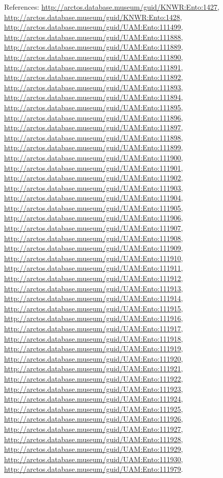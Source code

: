 \documentclass[9pt, article]{memoir}
\begin{document}
\begin{multicols}{2}
References: 
\url{http://arctos.database.museum/guid/KNWR:Ento:1427}, 
\url{http://arctos.database.museum/guid/KNWR:Ento:1428}, 
\url{http://arctos.database.museum/guid/UAM:Ento:111499}, 
\url{http://arctos.database.museum/guid/UAM:Ento:111888}, 
\url{http://arctos.database.museum/guid/UAM:Ento:111889}, 
\url{http://arctos.database.museum/guid/UAM:Ento:111890}, 
\url{http://arctos.database.museum/guid/UAM:Ento:111891}, 
\url{http://arctos.database.museum/guid/UAM:Ento:111892}, 
\url{http://arctos.database.museum/guid/UAM:Ento:111893}, 
\url{http://arctos.database.museum/guid/UAM:Ento:111894}, 
\url{http://arctos.database.museum/guid/UAM:Ento:111895}, 
\url{http://arctos.database.museum/guid/UAM:Ento:111896}, 
\url{http://arctos.database.museum/guid/UAM:Ento:111897}, 
\url{http://arctos.database.museum/guid/UAM:Ento:111898}, 
\url{http://arctos.database.museum/guid/UAM:Ento:111899}, 
\url{http://arctos.database.museum/guid/UAM:Ento:111900}, 
\url{http://arctos.database.museum/guid/UAM:Ento:111901}, 
\url{http://arctos.database.museum/guid/UAM:Ento:111902}, 
\url{http://arctos.database.museum/guid/UAM:Ento:111903}, 
\url{http://arctos.database.museum/guid/UAM:Ento:111904}, 
\url{http://arctos.database.museum/guid/UAM:Ento:111905}, 
\url{http://arctos.database.museum/guid/UAM:Ento:111906}, 
\url{http://arctos.database.museum/guid/UAM:Ento:111907}, 
\url{http://arctos.database.museum/guid/UAM:Ento:111908}, 
\url{http://arctos.database.museum/guid/UAM:Ento:111909}, 
\url{http://arctos.database.museum/guid/UAM:Ento:111910}, 
\url{http://arctos.database.museum/guid/UAM:Ento:111911}, 
\url{http://arctos.database.museum/guid/UAM:Ento:111912}, 
\url{http://arctos.database.museum/guid/UAM:Ento:111913}, 
\url{http://arctos.database.museum/guid/UAM:Ento:111914}, 
\url{http://arctos.database.museum/guid/UAM:Ento:111915}, 
\url{http://arctos.database.museum/guid/UAM:Ento:111916}, 
\url{http://arctos.database.museum/guid/UAM:Ento:111917}, 
\url{http://arctos.database.museum/guid/UAM:Ento:111918}, 
\url{http://arctos.database.museum/guid/UAM:Ento:111919}, 
\url{http://arctos.database.museum/guid/UAM:Ento:111920}, 
\url{http://arctos.database.museum/guid/UAM:Ento:111921}, 
\url{http://arctos.database.museum/guid/UAM:Ento:111922}, 
\url{http://arctos.database.museum/guid/UAM:Ento:111923}, 
\url{http://arctos.database.museum/guid/UAM:Ento:111924}, 
\url{http://arctos.database.museum/guid/UAM:Ento:111925}, 
\url{http://arctos.database.museum/guid/UAM:Ento:111926}, 
\url{http://arctos.database.museum/guid/UAM:Ento:111927}, 
\url{http://arctos.database.museum/guid/UAM:Ento:111928}, 
\url{http://arctos.database.museum/guid/UAM:Ento:111929}, 
\url{http://arctos.database.museum/guid/UAM:Ento:111930}, 
\url{http://arctos.database.museum/guid/UAM:Ento:111979}.


\end{multicols}
\end{document}
